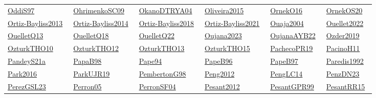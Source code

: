 \begin{longtable}{*{6}{l}}
\href{../works/OddiS97.pdf}{OddiS97}~\cite{OddiS97} & \href{../works/OhrimenkoSC09.pdf}{OhrimenkoSC09}~\cite{OhrimenkoSC09} & \href{../}{OkanoDTRYA04}~\cite{OkanoDTRYA04} & \href{../}{Oliveira2015}~\cite{Oliveira2015} & \href{../works/OrnekO16.pdf}{OrnekO16}~\cite{OrnekO16} & \href{../works/OrnekOS20.pdf}{OrnekOS20}~\cite{OrnekOS20}\\ 
\href{../works/Ortiz-Bayliss2013.pdf}{Ortiz-Bayliss2013}~\cite{Ortiz-Bayliss2013} & \href{../}{Ortiz-Bayliss2014}~\cite{Ortiz-Bayliss2014} & \href{../works/Ortiz-Bayliss2018.pdf}{Ortiz-Bayliss2018}~\cite{Ortiz-Bayliss2018} & \href{../works/Ortiz-Bayliss2021.pdf}{Ortiz-Bayliss2021}~\cite{Ortiz-Bayliss2021} & \href{../works/Ouaja2004.pdf}{Ouaja2004}~\cite{Ouaja2004} & \href{../works/Ouellet2022.pdf}{Ouellet2022}~\cite{Ouellet2022}\\ 
\href{../works/OuelletQ13.pdf}{OuelletQ13}~\cite{OuelletQ13} & \href{../works/OuelletQ18.pdf}{OuelletQ18}~\cite{OuelletQ18} & \href{../works/OuelletQ22.pdf}{OuelletQ22}~\cite{OuelletQ22} & \href{../works/Oujana2023.pdf}{Oujana2023}~\cite{Oujana2023} & \href{../works/OujanaAYB22.pdf}{OujanaAYB22}~\cite{OujanaAYB22} & \href{../works/Ozder2019.pdf}{Ozder2019}~\cite{Ozder2019}\\ 
\href{../works/OzturkTHO10.pdf}{OzturkTHO10}~\cite{OzturkTHO10} & \href{../works/OzturkTHO12.pdf}{OzturkTHO12}~\cite{OzturkTHO12} & \href{../works/OzturkTHO13.pdf}{OzturkTHO13}~\cite{OzturkTHO13} & \href{../works/OzturkTHO15.pdf}{OzturkTHO15}~\cite{OzturkTHO15} & \href{../works/PachecoPR19.pdf}{PachecoPR19}~\cite{PachecoPR19} & \href{../works/PacinoH11.pdf}{PacinoH11}~\cite{PacinoH11}\\ 
\href{../works/PandeyS21a.pdf}{PandeyS21a}~\cite{PandeyS21a} & \href{../works/PapaB98.pdf}{PapaB98}~\cite{PapaB98} & \href{../works/Pape94.pdf}{Pape94}~\cite{Pape94} & \href{../}{PapeB96}~\cite{PapeB96} & \href{../works/PapeB97.pdf}{PapeB97}~\cite{PapeB97} & \href{../}{Paredis1992}~\cite{Paredis1992}\\ 
\href{../}{Park2016}~\cite{Park2016} & \href{../works/ParkUJR19.pdf}{ParkUJR19}~\cite{ParkUJR19} & \href{../works/PembertonG98.pdf}{PembertonG98}~\cite{PembertonG98} & \href{../}{Peng2012}~\cite{Peng2012} & \href{../works/PengLC14.pdf}{PengLC14}~\cite{PengLC14} & \href{../works/PenzDN23.pdf}{PenzDN23}~\cite{PenzDN23}\\ 
\href{../works/PerezGSL23.pdf}{PerezGSL23}~\cite{PerezGSL23} & \href{../works/Perron05.pdf}{Perron05}~\cite{Perron05} & \href{../works/PerronSF04.pdf}{PerronSF04}~\cite{PerronSF04} & \href{../works/Pesant2012.pdf}{Pesant2012}~\cite{Pesant2012} & \href{../works/PesantGPR99.pdf}{PesantGPR99}~\cite{PesantGPR99} & \href{../works/PesantRR15.pdf}{PesantRR15}~\cite{PesantRR15}\\ 

\end{longtable}
